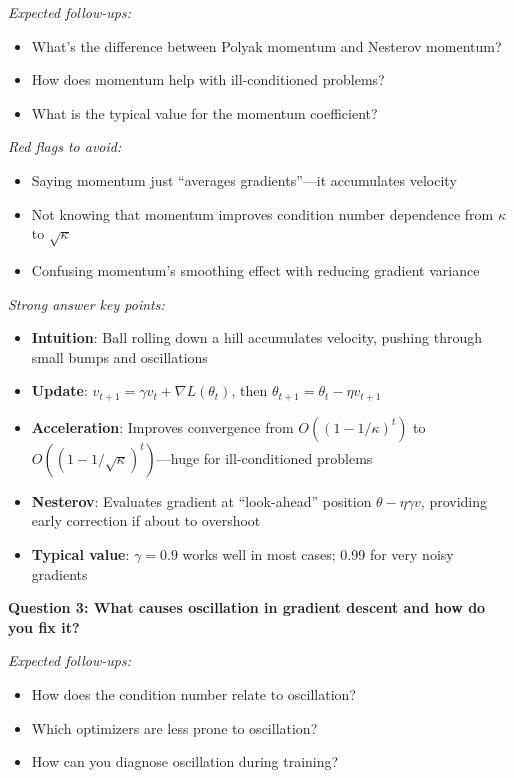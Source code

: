 \documentclass[../../main.tex]{subfiles}
\begin{document}
\begin{interviewquestions}
\textit{Expected follow-ups:}
\begin{itemize}
    \item What's the difference between Polyak momentum and Nesterov momentum?
    \item How does momentum help with ill-conditioned problems?
    \item What is the typical value for the momentum coefficient?
\end{itemize}

\textit{Red flags to avoid:}
\begin{itemize}
    \item Saying momentum just ``averages gradients''---it accumulates velocity
    \item Not knowing that momentum improves condition number dependence from $\kappa$ to $\sqrt{\kappa}$
    \item Confusing momentum's smoothing effect with reducing gradient variance
\end{itemize}

\textit{Strong answer key points:}
\begin{itemize}
    \item \textbf{Intuition}: Ball rolling down a hill accumulates velocity, pushing through small bumps and oscillations
    \item \textbf{Update}: $v_{t+1} = \gamma v_t + \nabla L(\theta_t)$, then $\theta_{t+1} = \theta_t - \eta v_{t+1}$
    \item \textbf{Acceleration}: Improves convergence from $O((1-1/\kappa)^t)$ to $O((1-1/\sqrt{\kappa})^t)$---huge for ill-conditioned problems
    \item \textbf{Nesterov}: Evaluates gradient at ``look-ahead'' position $\theta - \eta\gamma v$, providing early correction if about to overshoot
    \item \textbf{Typical value}: $\gamma = 0.9$ works well in most cases; 0.99 for very noisy gradients
\end{itemize}

\vspace{0.5em}
\textbf{Question 3: What causes oscillation in gradient descent and how do you fix it?}

\textit{Expected follow-ups:}
\begin{itemize}
    \item How does the condition number relate to oscillation?
    \item Which optimizers are less prone to oscillation?
    \item How can you diagnose oscillation during training?
\end{itemize}


\end{interviewquestions}
\end{document}
